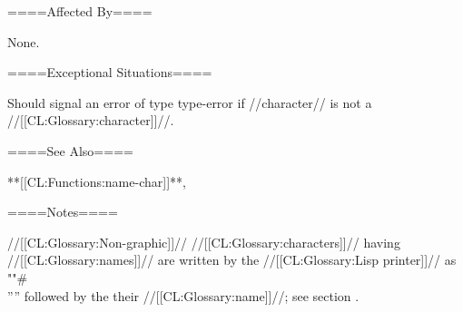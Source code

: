 ====Affected By====

None.

====Exceptional Situations====

Should signal an error of type type-error if //character// is not a //[[CL:Glossary:character]]//.

====See Also====

**[[CL:Functions:name-char]]**, {\secref\PrintingCharacters}

====Notes====

//[[CL:Glossary:Non-graphic]]// //[[CL:Glossary:characters]]// having //[[CL:Glossary:names]]// are written by the //[[CL:Glossary:Lisp printer]]// as ""#\\'''' followed by the their //[[CL:Glossary:name]]//; see section {\secref\PrintingCharacters}.

